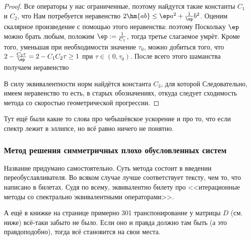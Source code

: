 \documentclass[a4paper]{article}
\begin{document}
\begin{proof}
Все операторы у нас ограниченные, поэтому найдутся такие константы
$C_1$ и $C_2$, что   Нам потребуется неравенство
$2\hm{ab} \le \ep a^2 + \frac1\ep b^2$.  Оценим скалярное произведение
с помощью этого неравенства: 
поэтому   Поскольку $\ep$ можно брать любым, положим
$\ep := \frac1{C_1}$, тогда третье слагаемое умрёт.  Кроме того,
уменьшая при необходимости значение $\tau_0$, можно добиться того, что
$2 - \frac{C_2\tau}{\ep} = 2 - C_1C_2\tau \ge 1$ при $\tau \in
(0,\tau_0)$.  После всего этого шаманства получаем неравенство

В силу эквивалентности норм найдётся константа $C_3$, для которой
  Следовательно, имеем
неравенство  то
есть, в старых обозначениях,  откуда следует сходимость метода со
скоростью геометрической прогрессии.
\end{proof}

\begin{petit}
Тут ещё были какие то слова про чебышёвское ускорение и про то, что
если спектр лежит в эллипсе, но всё равно ничего не понятно.
\end{petit}


\subsubsection{Метод решения симметричных плохо обусловленных систем}

\begin{petit}
Название придумано самостоятельно. Суть метода состоит в введении
переобуславливателя.  Во всяком случае лучше соответствует тексту, чем
то, что написано в билетах.  Судя по всему, эквивалентно билету про
<<итерационные методы со спектрально эквивалентными операторами>>.

А ещё в книжке на странице примерно 301 транспонирование у матрицы $D$
(см. ниже) всё-таки забыто не было.  Если оно и правда должно там быть
(а это правдоподобно), тогда всё становится на свои места.
\end{petit}
\end{document}
